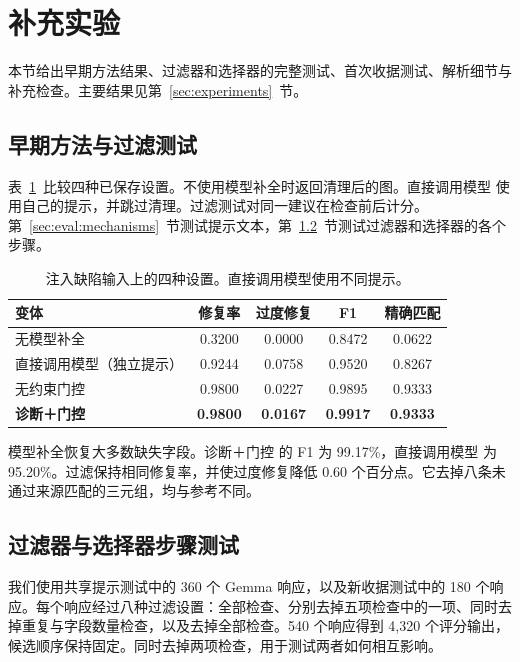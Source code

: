 \section{补充实验}
\label{app:historical_diagnostics}

本节给出早期方法结果、过滤器和选择器的完整测试、首次收据测试、解析细节与补充检查。主要结果见第~\ref{sec:experiments}~节。

\subsection{早期方法与过滤测试}
\label{sec:eval:ablation}

表~\ref{tab:repair_ablation}~比较四种已保存设置。不使用模型补全时返回清理后的图。直接调用模型 使用自己的提示，并跳过清理。过滤测试对同一建议在检查前后计分。第~\ref{sec:eval:mechanisms}~节测试提示文本，第~\ref{sec:eval:individual_ablation}~节测试过滤器和选择器的各个步骤。

\begin{table}[t]
\centering
\caption{注入缺陷输入上的四种设置。直接调用模型使用不同提示。}
\label{tab:repair_ablation}
\small
\begin{tabular}{l c c c c}
\toprule
变体 & 修复率 & 过度修复 & F1 & 精确匹配 \\
\midrule
无模型补全 & 0.3200 & 0.0000 & 0.8472 & 0.0622 \\
直接调用模型（独立提示） & 0.9244 & 0.0758 & 0.9520 & 0.8267 \\
无约束门控 & 0.9800 & 0.0227 & 0.9895 & 0.9333 \\
\textbf{诊断＋门控} & \textbf{0.9800} & \textbf{0.0167} & \textbf{0.9917} & \textbf{0.9333} \\
\bottomrule
\end{tabular}
\end{table}

模型补全恢复大多数缺失字段。诊断＋门控 的 F1 为 99.17\%，直接调用模型 为 95.20\%。过滤保持相同修复率，并使过度修复降低 0.60 个百分点。它去掉八条未通过来源匹配的三元组，均与参考不同。

\subsection{过滤器与选择器步骤测试}
\label{sec:eval:individual_ablation}

我们使用共享提示测试中的 360 个 Gemma 响应，以及新收据测试中的 180 个响应。每个响应经过八种过滤设置：全部检查、分别去掉五项检查中的一项、同时去掉重复与字段数量检查，以及去掉全部检查。540 个响应得到 4,320 个评分输出，候选顺序保持固定。同时去掉两项检查，用于测试两者如何相互影响。


